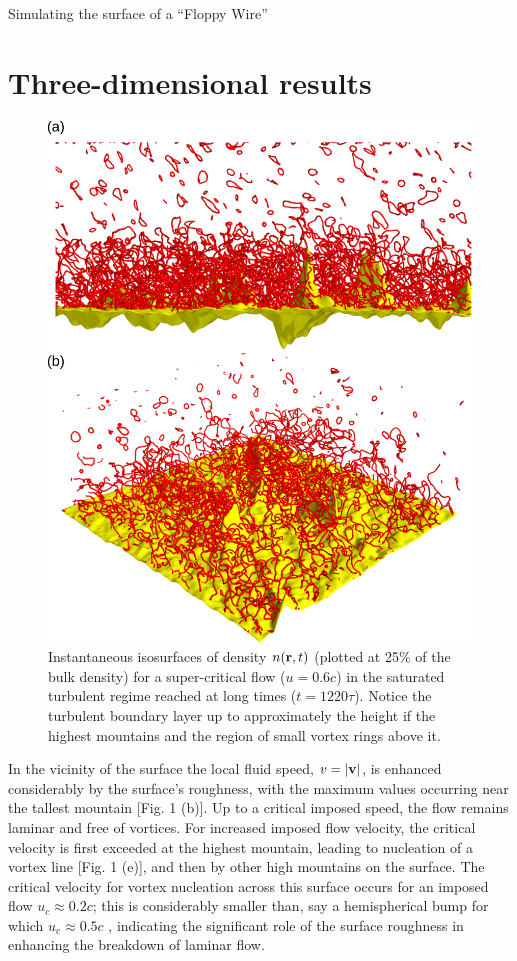 \begin{chapter}{\label{cha:afm}Simulating the surface of a ``Floppy Wire''}
\section{Three-dimensional results}
\begin{figure}
\centering
\includegraphics[width=0.5\linewidth]{./afm/fig2-2}
\caption{Instantaneous isosurfaces of density $n({\bf r},t)$ 
(plotted at 25\%  of the bulk density) for a super-critical flow ($u=0.6 c$) in the saturated 
turbulent regime reached at long times ($t=1220 \tau$).  Notice the turbulent boundary layer up to
approximately the height if the highest mountains and the region
of small vortex rings above it.}
\label{fig2}
\end{figure}  
{In the vicinity of the surface the local fluid speed}, $v=|{\bf v}|$, 
is enhanced considerably by the {surface's} roughness, 
with the maximum values occurring near the tallest mountain [Fig. 1 (b)].   Up to a critical imposed speed, the flow remains laminar and free of vortices.  For increased imposed flow velocity, the critical velocity is first exceeded at the highest mountain, leading to nucleation of a vortex line [Fig. 1 (e)], and then by other high mountains on the surface.  The critical velocity for vortex nucleation across this surface occurs for an imposed flow $u_c\approx 0.2 c$; this is considerably smaller than, say a hemispherical bump for which $u_c \approx 0.5 c$ \cite{winiecki},  indicating the significant role of the surface roughness in enhancing the breakdown of laminar flow.  


\end{chapter}
